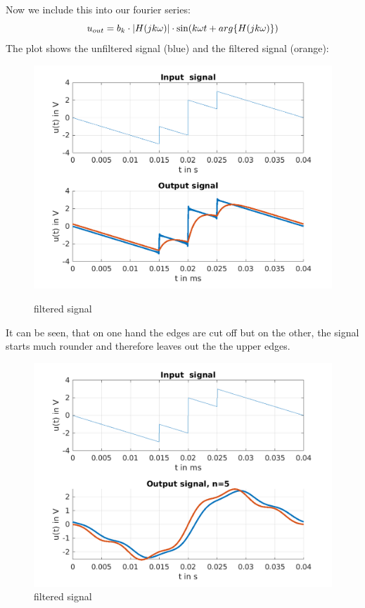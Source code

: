 \documentclass[a4paper]{article}
\begin{document}
Now we include this into our fourier series:
\begin{equation*}
	u_{out} = b_k \cdot |H(jk\omega)| \cdot \sin(k\omega t + arg\{H(jk\omega)\})\\
\end{equation*}
The plot shows the unfiltered signal (blue) and the filtered signal (orange):
\begin{figure}[h!]
	\includegraphics{"./Figures/output_signal.png"} \centering
	\label{fig:filterSig}
	\caption{filtered signal}
\end{figure}

It can be seen, that on one hand the edges are cut off but on the other, the signal starts much rounder and therefore leaves out the 
the upper edges.

\begin{figure}[h!]
	\includegraphics{"./Figures/output_signaln5.png"} \centering
	\caption{filtered signal}
\end{figure}
\end{document}
